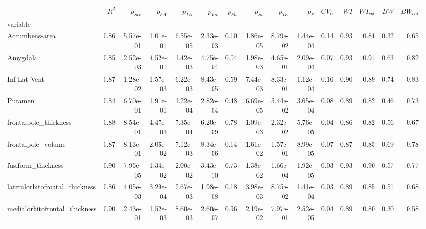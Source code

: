 \begin{table}
\centering
\begin{tabular}{lrrrrrrrrrrrrrr}
\toprule
{} &    $R^2$ &  $p_{Str}$ &  $p_{FA}$ &      $p_{TR}$ &  $p_{Int}$ &  $p_{Ph}$ &  $p_{Si}$ &      $p_{TE}$ &       $p_F$ &   $CV_{\alpha}$ &    $WI$ &  $WI_{cal}$ &    $BW$ &  $BW_{cal}$ \\
\midrule
variable                           &       &             &              &           &              &               &               &           &           &       &       &         &       &         \\
Accumbens-area                     &  0.86 &    5.57e-01 &     1.01e-01 &  6.55e-05 &     2.33e-03 &          0.10 &      1.86e-05 &  8.79e-02 &  1.44e-04 &  0.14 &  0.93 &    0.84 &  0.32 &    0.65 \\
Amygdala                           &  0.85 &    2.52e-03 &     4.52e-01 &  1.42e-03 &     4.75e-04 &          0.04 &      1.98e-03 &  4.65e-01 &  2.09e-04 &  0.07 &  0.93 &    0.91 &  0.63 &    0.82 \\
Inf-Lat-Vent                       &  0.87 &    1.28e-02 &     1.57e-03 &  6.22e-03 &     8.43e-05 &          0.59 &      7.44e-03 &  8.33e-01 &  1.12e-04 &  0.16 &  0.90 &    0.89 &  0.74 &    0.83 \\
Putamen                            &  0.84 &    6.70e-01 &     1.91e-01 &  1.22e-04 &     2.82e-04 &          0.48 &      6.69e-05 &  5.44e-02 &  3.65e-04 &  0.08 &  0.89 &    0.82 &  0.46 &    0.73 \\
frontalpole\_thickness              &  0.88 &    8.54e-01 &     4.47e-03 &  7.35e-04 &     6.20e-09 &          0.78 &      1.09e-03 &  2.32e-02 &  5.76e-05 &  0.04 &  0.86 &    0.82 &  0.56 &    0.67 \\
frontalpole\_volume                 &  0.87 &    8.13e-01 &     2.06e-02 &  7.12e-03 &     8.34e-06 &          0.14 &      1.61e-02 &  1.57e-01 &  8.99e-05 &  0.07 &  0.87 &    0.85 &  0.69 &    0.78 \\
fusiform\_thickness                 &  0.90 &    7.95e-05 &     1.34e-02 &  2.00e-02 &     3.43e-10 &          0.73 &      1.38e-02 &  1.66e-04 &  1.92e-05 &  0.03 &  0.93 &    0.90 &  0.57 &    0.77 \\
lateralorbitofrontal\_thickness     &  0.86 &    4.05e-03 &     3.29e-04 &  2.67e-03 &     1.98e-08 &          0.18 &      3.98e-03 &  8.75e-02 &  1.41e-04 &  0.03 &  0.89 &    0.85 &  0.51 &    0.68 \\
medialorbitofrontal\_thickness      &  0.90 &    2.43e-01 &     1.52e-03 &  8.60e-03 &     2.60e-07 &          0.96 &      2.19e-02 &  7.97e-01 &  2.52e-05 &  0.04 &  0.89 &    0.80 &  0.30 &    0.58 \\

\end{tabular}
\end{table}
